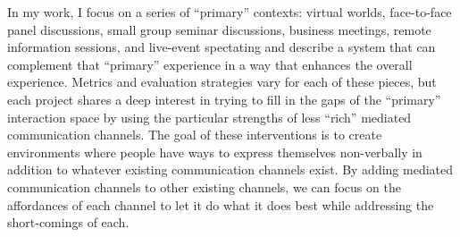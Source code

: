 


In my work, I focus on a series of ``primary'' contexts: virtual worlds, face-to-face panel discussions, small group seminar discussions, business meetings, remote information sessions, and live-event spectating and describe a system that can complement that ``primary'' experience in a way that enhances the overall experience. Metrics and evaluation strategies vary for each of these pieces, but each project shares a deep interest in trying to fill in the gaps of the ``primary'' interaction space by using the particular strengths of less ``rich'' mediated communication channels. The goal of these interventions is to create environments where people have ways to express themselves non-verbally in addition to whatever existing communication channels exist. By adding mediated communication channels to other existing channels, we can focus on the affordances of each channel to let it do what it does best while addressing the short-comings of each.



